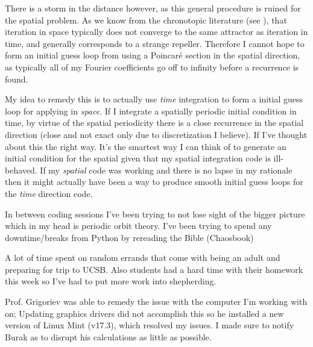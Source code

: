 \begin{description}
{\begin{description}
There is a storm in the distance however, as this general procedure is
ruined for the spatial problem. As we know from the chronotopic
literature %
(see ), that
iteration in space typically does not converge to the same attractor as
iteration in time, and generally corresponds to a strange repeller.
Therefore I cannot hope to form an initial guess loop from using a
Poincar\'e section in the spatial direction, as typically all of my
Fourier coefficients go off to infinity before a recurrence is found.

My idea to remedy this is to actually use \emph{time} integration to form a initial guess loop for applying {\descent} in \emph{space}. If I integrate a spatially periodic initial condition in time, by virtue of the spatial periodicity there is a close recurrence in the spatial direction (close and not exact only due to discretization I believe). If I've thought about this the right way. It's the smartest way I can think of to generate an initial condition for the spatial {\descent}  given that my spatial integration code is ill-behaved. If my \emph{spatial} code was working and there is no lapse in my rationale then it might actually have been a way to produce smooth initial guess loops for the \emph{time} direction {\descent} code.

\item[Reading]
In between coding sessions I've been trying to not lose sight of the bigger picture which in my head  is periodic orbit theory. I've been trying to spend any downtime/breaks from Python by rereading the Bible (Chaosbook)

\item[misc]
A lot of time spent on random errands that come with being an adult and preparing for trip to UCSB. Also students had a hard time with their homework this week so I've had to put more work into shepherding.

Prof. Grigoriev was able to remedy the issue with the computer I'm working with on; Updating graphics drivers did not accomplish this so he installed a new version of Linux Mint (v17.3), which resolved my issues. I made sure to notify Burak as to disrupt his calculations as little as possible.
\end{description}
}


\end{description}
